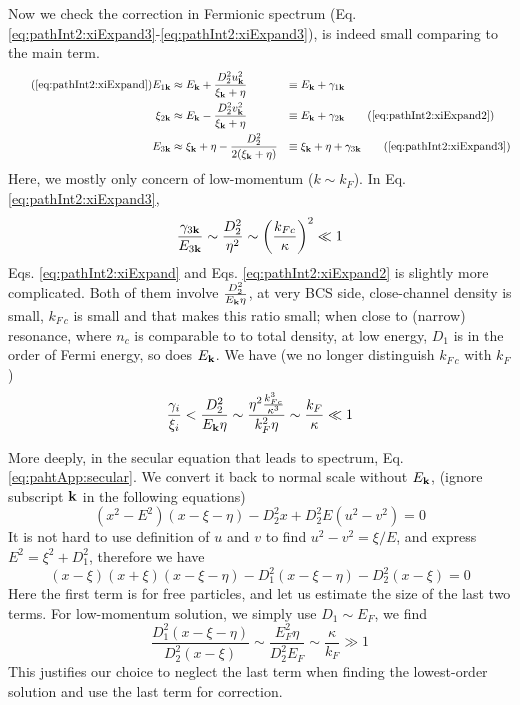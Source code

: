 Now we check the correction in Fermionic spectrum (Eq. \ref{eq:pathInt2:xiExpand3}-\ref{eq:pathInt2:xiExpand3}), 
is indeed small comparing to the main term.  
\begin{align}\tag{\ref{eq:pathInt2:xiExpand}}
E_{1\vk}&\approx{}E_{\vk}+\frac{D_{2}^{2}u_{\vk}^{2}}{\xi_{\vk}+\eta}&\equiv{}&E_{\vk}+\gamma_{1\vk}\\
\xi_{2\vk}&\approx{}E_{\vk}-\frac{D_{2}^{2}v_{\vk}^{2}}{\xi_{\vk}+\eta}&\equiv{}&E_{\vk}+\gamma_{2\vk}
\tag{\ref{eq:pathInt2:xiExpand2}}\\
E_{3\vk}&\approx{}\xi_{\vk}+\eta-\frac{D_{2}^{2}}{2(\xi_{\vk}+\eta)}&\equiv{}&\xi_{\vk}+\eta+\gamma_{3\vk}
\tag{\ref{eq:pathInt2:xiExpand3}}
\end{align}
Here, we mostly only concern of low-momentum ($k\sim{}k_{F}$).  In Eq. \ref{eq:pathInt2:xiExpand3}, 
\begin{equation*}
\frac{\gamma_{3\mathbf{k}}}{E_{3\mathbf{k}}}\sim{}\frac{D_{2}^{2}}{\eta^{2}}\sim\left(\frac{k_{Fc}}{\kappa}\right)^{2}\ll1
\end{equation*}
Eqs. \ref{eq:pathInt2:xiExpand} and Eqs. \ref{eq:pathInt2:xiExpand2} is slightly more complicated.  Both of them involve $\frac{D_{2}^{2}}{E_{\mathbf{k}}\eta}$,  at very BCS side, close-channel density is small, $k_{F\,c}$ is small and that makes this ratio small; when close to (narrow) resonance, where $n_{c}$ is comparable to to total density, at low energy, $D_{1}$ is in the order of Fermi energy, so does $E_{\mathbf{k}}$.   We have (we no longer distinguish $k_{F\,c}$ with $k_{F}$)
 \begin{equation*}
 \frac{\gamma_{i}}{\xi_{i}}<\frac{D_{2}^{2}}{E_{\mathbf{k}}\eta}\sim\frac{\eta^{2}\frac{k_{Fc}^{3}}{\kappa^{3}}}{k_{F}^{2}\eta}\sim\frac{k_{F}}{\kappa}\ll1
\end{equation*}

More deeply, in the secular equation that leads to spectrum, Eq. \ref{eq:pahtApp:secular}.  We convert it back to normal scale without $E_{\mathbf{k}}$,  (ignore subscript $\mathbf{k}$ in the following equations)
\begin{equation*}
(x^{2}-E^{2})(x-\xi-\eta)-D_{2}^{2}x+D_{2}^{2}E(u^{2}-v^{2})=0
\end{equation*}
It is not hard to use definition of $u$ and $v$ to find $u^{2}-v^{2}=\xi/E$, and express $E^{2}=\xi^{2}+D_{1}^{2}$, therefore we have
\begin{equation*}
(x-\xi)(x+\xi)(x-\xi-\eta)-D_{1}^{2}(x-\xi-\eta)-D_{2}^{2}(x-\xi)=0
\end{equation*}
Here the first term is for free particles, and let us estimate the size of the last two terms.  For low-momentum solution, we simply use $D_{1}\sim{}E_{F}$, we find
\begin{equation*}
\frac{D_{1}^{2}(x-\xi-\eta)}{D_{2}^{2}(x-\xi)}\sim\frac{E_{F}^{2}\eta}{D_{2}^{2}E_{F}}\sim\frac{\kappa}{k_{F}}\gg1
\end{equation*}
This justifies our choice to neglect the last term when finding the lowest-order solution and use the last term for correction.  

